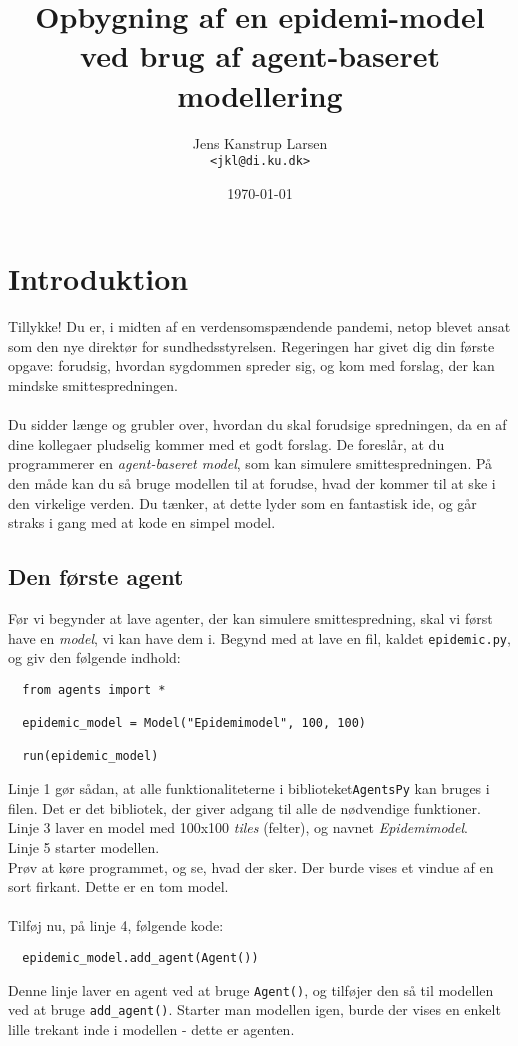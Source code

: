 \documentclass{article}
\title{Opbygning af en epidemi-model\\
\large ved brug af agent-baseret modellering}
\author{Jens Kanstrup Larsen\\ \texttt{<jkl@di.ku.dk>}}
\date{\today}
\begin{document}
\maketitle

\section{Introduktion}
Tillykke! Du er, i midten af en verdensomspændende pandemi, netop blevet ansat som den nye direktør for sundhedsstyrelsen. Regeringen har givet dig din første opgave: forudsig, hvordan sygdommen spreder sig, og kom med forslag, der kan mindske smittespredningen.\\\\
Du sidder længe og grubler over, hvordan du skal forudsige spredningen, da en af dine kollegaer pludselig kommer med et godt forslag. De foreslår, at du programmerer en \textit{agent-baseret model}, som kan simulere smittespredningen. På den måde kan du så bruge modellen til at forudse, hvad der kommer til at ske i den virkelige verden. Du tænker, at dette lyder som en fantastisk ide, og går straks i gang med at kode en simpel model.

\subsection{Den første agent}
Før vi begynder at lave agenter, der kan simulere smittespredning, skal vi først have en \textit{model}, vi kan have dem i. Begynd med at lave en fil, kaldet \texttt{epidemic.py}, og giv den følgende indhold:
\begin{lstlisting}
  from agents import *

  epidemic_model = Model("Epidemimodel", 100, 100)

  run(epidemic_model)
\end{lstlisting}
Linje 1 gør sådan, at alle funktionaliteterne i biblioteket\texttt{AgentsPy} kan bruges i filen. Det er det bibliotek, der giver adgang til alle de nødvendige funktioner.\\
Linje 3 laver en model med 100x100 \textit{tiles} (felter), og navnet \textit{Epidemimodel}.\\
Linje 5 starter modellen.\\
Prøv at køre programmet, og se, hvad der sker. Der burde vises et vindue af en sort firkant. Dette er en tom model.\\\\
Tilføj nu, på linje 4, følgende kode:
\begin{lstlisting}
  epidemic_model.add_agent(Agent())
\end{lstlisting}
Denne linje laver en agent ved at bruge \texttt{Agent()}, og tilføjer den så til modellen ved at bruge \texttt{add\_agent()}. Starter man modellen igen, burde der vises en enkelt lille trekant inde i modellen - dette er agenten.
\end{document}
